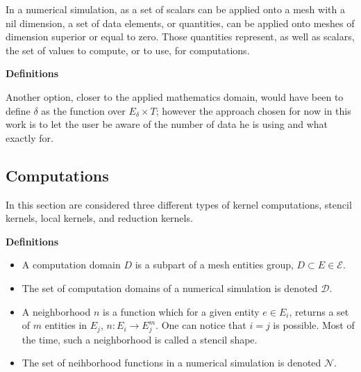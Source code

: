In a numerical simulation, as a set of scalars can be applied onto a mesh with a nil dimension, a set of data elements, or quantities, can be applied onto meshes of dimension superior or equal to zero. Those quantities represent, as well as scalars, the set of values to compute, or to use, for computations.

\noindent \textbf{Definitions}

Another option, closer to the applied mathematics domain, would have been to define $\delta$ as the function over $E_{\delta} \times T$; however the approach chosen for now in this work is to let the user be aware of the number of data he is using and what exactly for.

\subsection{Computations}

In this section are considered three different types of kernel computations, stencil kernels, local kernels, and reduction kernels. 

\noindent \textbf{Definitions}
\begin{itemize}
\item A computation domain $D$ is a subpart of a mesh entities group, $D \subset E \in \mathcal{E}$.
\item The set of computation domains of a numerical simulation is denoted $\mathcal{D}$.
\item A neighborhood $n$ is a function which for a given entity $e \in E_i$, returns a set of $m$ entities in $E_j$, $n : E_i \rightarrow E_j^m$. One can notice that $i = j$ is possible. Most of the time, such a neighborhood is called a stencil shape.
\item The set of neihborhood functions in a numerical simulation is denoted $\mathcal{N}$.
\end{itemize}


